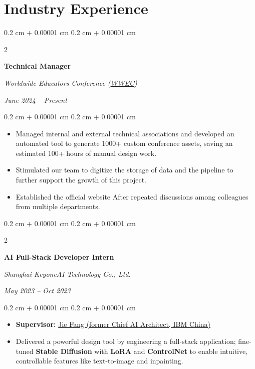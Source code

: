 \documentclass[10pt, letterpaper]{article}
\newenvironment{highlights}{
    \begin{itemize}[
        topsep=0.05 cm,
        parsep=0.05 cm,
        partopsep=0pt,
        itemsep=0pt,
        leftmargin=0.4 cm + 10pt
    ]
}{
    \end{itemize}
} %
\newenvironment{onecolentry}{
    \begin{adjustwidth}{
        0.2 cm + 0.00001 cm
    }{
        0.2 cm + 0.00001 cm
    }
}{
    \end{adjustwidth}
} %
\newenvironment{twocolentry}[2][]{
    \onecolentry
    \def\secondColumn{#2}
    \setcolumnwidth{\fill, 4.5 cm}
    \begin{paracol}{2}
}{
    \switchcolumn \raggedleft \secondColumn
    \end{paracol}
    \endonecolentry
} %
\begin{document}
\section{Industry Experience}
    \begin{twocolentry}{
        \textit{June 2024 – Present}
    }
        \textbf{Technical Manager}
        
        \textit{Worldwide Educators Conference (\href{https://www.wwec820.com/}{WWEC})}
        
    \end{twocolentry}
    \begin{onecolentry}
        \begin{highlights}
            \item Managed internal and external technical associations and developed an automated tool to generate 1000+ custom conference assets, saving an estimated 100+ hours of manual design work.
            \item Stimulated our team to digitize the storage of data and the pipeline to further support the growth of this project.
            \item Established the official website After repeated discussions among colleagues from multiple departments. \href{https://www.wwec820.com}{\faLink}
        \end{highlights}
    \end{onecolentry}

    \vspace{0.1cm}

    \begin{twocolentry}{
        \textit{May 2023 – Oct 2023}
    }
        \textbf{AI Full-Stack Developer Intern}
        
        \textit{Shanghai KeyoneAI Technology Co., Ltd.}
    \end{twocolentry}
    \begin{onecolentry}
        \begin{highlights}
            \item \textbf{Supervisor:} \href{https://www.linkedin.com/in/jie-fang-28293740}{Jie Fang (former Chief AI Architect, IBM China)}
            \item Delivered a powerful design tool by engineering a full-stack application; fine-tuned \textbf{Stable Diffusion} with \textbf{LoRA} and \textbf{ControlNet} to enable intuitive, controllable features like text-to-image and inpainting.
               \end{highlights}
    \end{onecolentry}
\end{document}
